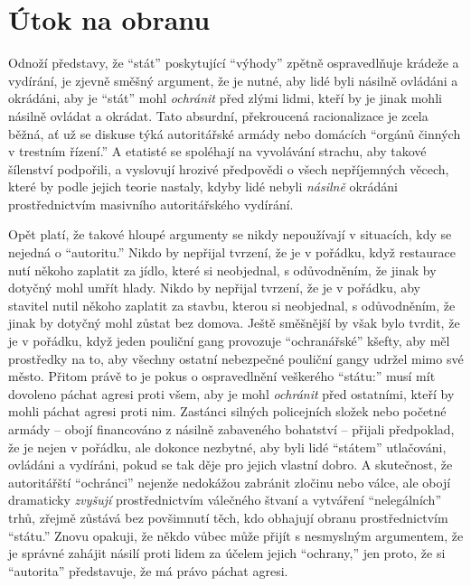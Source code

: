 \documentclass{book}
\begin{document}
\section{Útok na obranu}

Odnoží představy, že \enquote{stát} poskytující \enquote{výhody} zpětně ospravedlňuje krádeže a vydírání, je zjevně směšný argument, že je nutné, aby lidé byli násilně ovládáni a okrádáni, aby je \enquote{stát} mohl \emph{ochránit} před zlými lidmi, kteří by je jinak mohli násilně ovládat a okrádat. Tato absurdní, překroucená racionalizace je zcela běžná, ať už se diskuse týká autoritářské armády nebo domácích \enquote{orgánů činných v trestním řízení.} A etatisté se spoléhají na vyvolávání strachu, aby takové šílenství podpořili, a vyslovují hrozivé předpovědi o všech nepříjemných věcech, které by podle jejich teorie nastaly, kdyby lidé nebyli \emph{násilně} okrádáni prostřednictvím masivního autoritářského vydírání.

Opět platí, že takové hloupé argumenty se nikdy nepoužívají v situacích, kdy se nejedná o \enquote{autoritu.} Nikdo by nepřijal tvrzení, že je v pořádku, když restaurace nutí někoho zaplatit za jídlo, které si neobjednal, s odůvodněním, že jinak by dotyčný mohl umřít hlady. Nikdo by nepřijal tvrzení, že je v pořádku, aby stavitel nutil někoho zaplatit za stavbu, kterou si neobjednal, s odůvodněním, že jinak by dotyčný mohl zůstat bez domova. Ještě směšnější by však bylo tvrdit, že je v pořádku, když jeden pouliční gang provozuje \enquote{ochranářské} kšefty, aby měl prostředky na to, aby všechny ostatní nebezpečné pouliční gangy udržel mimo své město. Přitom právě to je pokus o ospravedlnění veškerého \enquote{státu:} musí mít dovoleno páchat agresi proti všem, aby je mohl \emph{ochránit} před ostatními, kteří by mohli páchat agresi proti nim. Zastánci silných policejních složek nebo početné armády -- obojí financováno z násilně zabaveného bohatství -- přijali předpoklad, že je nejen v pořádku, ale dokonce nezbytné, aby byli lidé \enquote{státem} utlačováni, ovládáni a vydíráni, pokud se tak děje pro jejich vlastní dobro. A skutečnost, že autoritářští \enquote{ochránci} nejenže nedokážou zabránit zločinu nebo válce, ale obojí dramaticky \emph{zvyšují} prostřednictvím válečného štvaní a vytváření \enquote{nelegálních} trhů, zřejmě zůstává bez povšimnutí těch, kdo obhajují obranu prostřednictvím \enquote{státu.} Znovu opakuji, že někdo vůbec může přijít s nesmyslným argumentem, že je správné zahájit násilí proti lidem za účelem jejich \enquote{ochrany,} jen proto, že si \enquote{autorita} představuje, že má právo páchat agresi.
\end{document}
